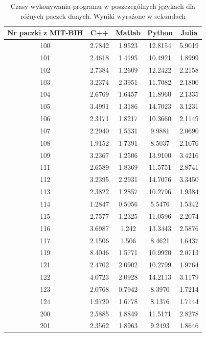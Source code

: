 \begin{table}[!tp]
	\centering
	\caption{Czasy wykonywania programu w poszczególnych językach dla różnych paczek danych. Wyniki wyrażone w sekundach}
	\label{tabResults}
	\begin{tabular}{|c|c|c|c|c|}
		\hline
		Nr paczki z MIT-BIH & C++ & Matlab & Python & Julia\\ \hline		
		
		100 & 2.7842 & 1.9523 & 12.8154 & 5.9019\\ \hline
		101 & 2.4618 & 1.4195 & 10.4921 & 1.8999\\ \hline
		102 & 2.7384 & 1.2609 & 12.2422 & 2.2158\\ \hline
		103 & 3.2374 & 2.3951 & 11.7082 & 2.1800\\ \hline
		104 & 2.6769 & 1.6457 & 11.8960 & 2.1335\\ \hline
		105 & 3.4991 & 1.3186 & 14.7023 & 3.1231\\ \hline
		106 & 2.3171 & 1.8217 & 10.3660 & 2.1149\\ \hline
		107 & 2.2940 & 1.5331 &  9.9881 & 2.0690\\ \hline
		108 & 1.9152 & 1.7391 &  8.5037 & 2.1076\\ \hline
		109 & 3.2367 & 1.2506 & 13.9100 & 3.4216\\ \hline
		111 & 2.6589 & 1.8369 & 11.5751 & 2.8741\\ \hline
		112 & 3.2395 & 2.2931 & 14.7076 & 3.3450\\ \hline
		113 & 2.3822 & 1.2857 & 10.2796 & 1.9384\\ \hline
		114 & 1.2847 & 0.5056 &  5.5476 & 1.5342\\ \hline
		115 & 2.7577 & 1.2325 & 11.0596 & 2.2074\\ \hline
		116 & 3.6987 & 1.242  & 13.3443 & 2.5876\\ \hline
		117 & 2.1506 & 1.506  &  8.4621 & 1.6437\\ \hline
		119 & 8.4046 & 1.5771 & 10.9920 & 2.0713\\ \hline
		121 & 2.4702 & 2.0902 & 10.2799 & 1.9764\\ \hline
		122 & 4.0723 & 2.0928 & 14.2113 & 3.1179\\ \hline
		123 & 2.0768 & 0.7942 &  8.3970 & 1.7214\\ \hline
		124 & 1.9720 & 1.6778 &  8.1376 & 1.7144\\ \hline
		200 & 2.5885 & 1.8849 & 11.5171 & 2.8278\\ \hline
		201 & 2.3562 & 1.8963 &  9.2493 & 1.8646\\ \hline

\end{tabular}
\end{table}
